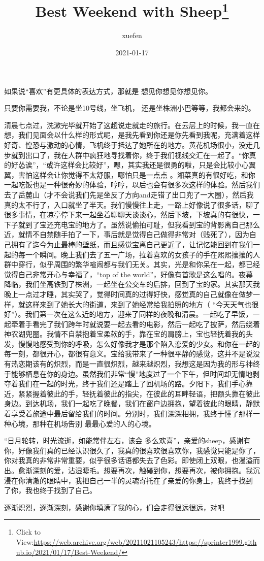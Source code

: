 \documentclass{article}
\title{Best Weekend with Sheep\footnote{Click to View:\url{https://web.archive.org/web/20211021105243/https://sprinter1999.github.io/2021/01/17/Best-Weekend/}}}
\author{xuefen}
\date{2021-01-17}
\begin{document}

\maketitle


\Large

如果说“喜欢”有更具体的表达方式，那就是
想见你想见你想见你。 

只要你需要我，不论是坐10号线，坐飞机，
还是坐株洲小巴等等，我都会来的。 

清晨七点过，洗漱完毕就开始了这趟说走就走的旅行。在云层上的时候，我一直在想，我们见面会以什么样的形式呢，是我先看到你还是你先看到我呢，充满着这样好奇、惶恐与激动的心情，飞机终于抵达了她所在的地方。黄花机场很小，没走几步就到出口了，我在人群中疯狂地寻找着你，终于我们视线交汇在一起了。“你真的好怂诶”，“或许这样会比较好”，嗯，其实我还是很勇的啦，只是会比较小心翼翼，害怕这样会让你觉得不太舒服，哪怕只是一点点
\newpage
。湘菜真的有很好吃，和你一起吃饭也是一种很奇妙的体验，哼哼，以后也会有很多次这样的体验。然后我们去了岳麓山（才不会说我们先是坐反了方向and走错了出口兜了一大圈），然后我真的太不行了，入口就坐了半天。我们慢慢往上走，一路上好像说了很多话，聊了很多事情，在凉亭停下来一起坐着聊聊天谈谈心，然后下坡，下坡真的有很快，一下子就到了宝还充电宝的地方了。虽然说偷拍可耻，但我看到宝的背影离自己那么近，就情不自禁随手拍了一下，事后就是觉得自己做得非常对（贱死了），因为自己拥有了迄今为止最棒的壁纸，而且感觉宝离自己更近了，让记忆能回到在我们一起的每一个瞬间。晚上我们去了五一广场，拉着喜欢的女孩子的手在熙熙攘攘的人群中穿行，似乎周围的繁华喧闹都与我们无关。其实，光是和你呆在一起，都已经觉得自己非常开心与幸福了，“top of the world”，好像有首歌是这么唱的。夜幕降临，我们坐高铁到了株洲，一起坐在公交车的后排，回到了宝的家。其实那天我晚上一点过才睡，其实哭了，觉得时间真的过得好快，感觉真的自己就像在做梦一样，就这样来到了她长大的街道，来到了她经常给我拍照的地方（
\newpage
“今天天气也很好”）。我们第一次在这么近的地方，迎来了同样的夜晚和清晨。一起吃了早饭，一起牵着手看完了我们跨年时就说要一起去看的电影，然后一起吃了披萨，然后绕着神农湖兜圈。我情不自禁抱着宝柔软的手，靠在宝的肩膀上，宝也轻抚着我的头发，慢慢地感受到你的呼吸，怎么好像我才是那个陷入恋爱的少女。和你在一起的每一刻，都很开心，都很有意义。宝给我带来了一种很平静的感觉，这并不是说没有热恋期该有的炽烈，而是一直很炽烈，越来越炽烈，我想这是因为我的形与神终于能够栖息在你的身边。虽然我们非常“慢”地度过了一个下午，但时间却无情地剥夺着我们在一起的时光，终于我们还是踏上了回机场的路。夕阳下，我们手心靠近，紧紧握着彼此的手，轻抚着彼此的指尖，在彼此的耳畔轻语，把额头靠在彼此身边。到达机场，我们一起吃了晚餐，我们在窗户边拥抱，望着彼此的眼睛，静默着享受着旅途中最后留给我们的时间。分别时，我们深深相拥，我终于懂了那样一种心境，那种在机场告别
最最心爱的人的心境。 

“日月轮转，时光流逝，如能常伴左右，该会
\newpage
多么欢喜”，亲爱的sheep，感谢有你，好像我们真的已经认识很久了，我真的很喜欢很喜欢你，我感觉只能是你了，你对我真的非常非常重要，似乎很多话语都失去了色彩。即使闭上双眼，也漫溢而出。愈渐深刻的爱，沾湿睫毛。想要再次，触碰到你，想要再次，被你拥抱。我沉浸在你清澈的眼睛中，我把自己一半的灵魂寄托在了亲爱的你身上，我终于找到
了你，我也终于找到了自己。 

逐渐炽烈，逐渐深刻，感谢你填满了我的心，们会走得很远很远，对吧
\end{document}
